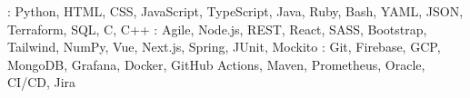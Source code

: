
    {: Python, HTML, CSS, JavaScript, TypeScript, Java, Ruby, Bash, YAML, JSON, Terraform, SQL, C, C++}
    {: Agile, Node.js, REST, React, SASS, Bootstrap, Tailwind, NumPy, Vue, Next.js, Spring, JUnit, Mockito}
    {: Git, Firebase, GCP, MongoDB, Grafana, Docker, GitHub Actions, Maven, Prometheus, Oracle, CI/CD, Jira}